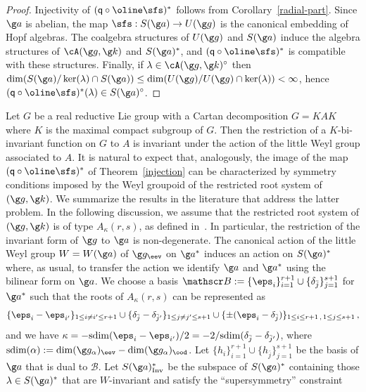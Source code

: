 \documentclass[11pt]{amsart}
\begin{document}
\begin{proof}
Injectivity of $(\mathsf q\circ\oline\sfs)^*$ follows from Corollary~\ref{radial-part}. 
Since $\g a$ is abelian, the map $\sfs: S(\g a)\to U(\g g)$ is the canonical embedding of Hopf algebras. The coalgebra  structures of $U(\g g)$ and $S(\g a)$ induce the algebra structures of $\cA(\g g,\g k)$ and $S(\g a)^*$, and $(\mathsf q\circ\oline\sfs)^*$ is compatible with these structures. Finally, if $\lambda\in \cA(\g g,\g k)^\circ$ then $\dim(S(\g a)/\ker(\lambda)\cap S(\g a))\leq \dim(U(\g g)/U(\g g)\cap\ker(\lambda))<\infty$, hence $(\mathsf q\circ\oline\sfs)^*(\lambda)\in S(\g a)^\circ$. 
\end{proof}

\begin{rmk}
\label{rmk:GK}Let $G$ be a real reductive Lie group with a Cartan decomposition $G=KAK$ where $K$ is the maximal compact subgroup of $G$. Then the restriction of a $K$-bi-invariant function on $G$ to $A$ is invariant under the action of the little Weyl group associated to $A$. 
It is natural to expect that, analogously,  the image  of 
the map $(\mathsf q\circ\oline\sfs)^*$ of Theorem~\ref{injection} can be   characterized by symmetry conditions imposed by the Weyl groupoid of the restricted root system of $(\g g,\g k)$. 
 We summarize the results in the literature that address the latter problem. In the following discussion, we assume that  the restricted root system of $(\g g,\g k)$ is
of type $A_\kappa(r,s)$, as defined in~\cite[Sec. 2]{SVdeformedq}. In particular, the restriction of the invariant form of $\g g$ to $\g a$ is non-degenerate.  The canonical action of the
little Weyl group $W=W(\g a)$ of $\g g_\eev$ on  $\g a^*$ induces an action on $S(\g a)^*$ where, as usual, to transfer the action we identify $\g a$ and $\g a^*$ using the bilinear form on $\g a$. We choose a basis $\mathscr B:=\{\eps_i\}_{i=1}^{r+1}\cup\{\delta_{\bar j}\}_{j=1}^{s+1}$
for $\g a^*$ such that the roots of  $A_\kappa(r,s)$ can be  represented as 
\[
\{\eps_i-\eps_{i'}\}_{1\leq i\neq i'\leq r+1}
\cup
\{\delta_{\bar j}-\delta_{\bar j'}\}_{1\leq j\neq j'\leq s+1}
\cup\{
\pm(\eps_i-\delta_{\bar j})
\}_{1\leq i\leq r+1\,,\,1\leq j\leq s+1 }\,,
\]
and we have $\kappa=-\mathrm{sdim}(\eps_i-\eps_{i'})/2=-2/{\mathrm{sdim}(\delta_{\bar j}-\delta_{{\bar j}'}})$, where $\mathrm{sdim}(\alpha):=\dim(\g g_\alpha)_\eev-\dim(\g g_\alpha)_\ood$.   Let $\{h_i\}_{i=1}^{r+1}\cup \{h_{\bar j}\}_{j=1}^{s+1}$
be the basis of $\g a$ that is dual to $\mathscr B$. 
Let $S(\g a)^*_\mathrm{Inv}$ be the subspace of $S(\g a)^*$ containing those $\lambda\in S(\g a)^*$  that are $W$-invariant and satisfy the ``supersymmetry'' constraint \[
\]
\end{rmk}
\end{document}
